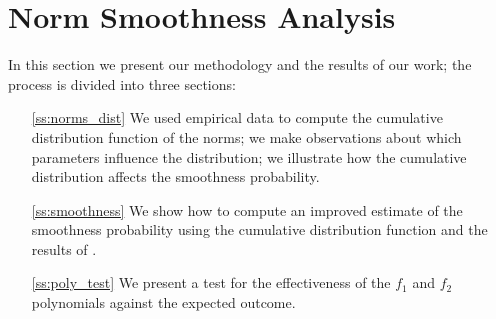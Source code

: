 \documentclass[a4paper, 12pt, envcountsect, runningheads]{llncs}
\numberwithin{figure}{section}
\numberwithin{equation}{section}
\begin{document}
\section{Norm Smoothness Analysis}
\label{s:results}
In this section we present our methodology and the results of our work; the process is divided into three sections:
\begin{itemize}
\item[\ref{ss:norms_dist}] We used empirical data to compute the cumulative distribution function of the norms; we make observations about which parameters influence the distribution; we illustrate how the cumulative distribution affects the smoothness probability.

\item[\ref{ss:smoothness}] We show how to compute an improved estimate of the smoothness probability using the cumulative distribution function and the results of \cite{dan_psi_est}.

\item[\ref{ss:poly_test}] We present a test for the effectiveness of the $f_1$ and $f_2$ polynomials against the expected outcome.

\end{itemize}
\end{document}
